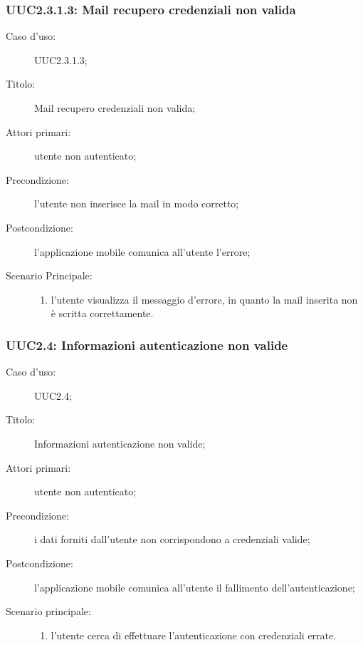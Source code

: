 \documentclass[../../../analisi-dei-requisiti.tex]{subfiles}
\begin{document}
\subsubsection{UUC2.3.1.3: Mail recupero credenziali non valida}%
\label{subs:UUC2.3.1.3}

\begin{description}
  \item[Caso d’uso:] UUC2.3.1.3;
  \item[Titolo:] Mail recupero credenziali non valida;
  \item[Attori primari:] utente non autenticato;
  \item[Precondizione:] l'utente non inserisce la mail in modo corretto;
  \item[Postcondizione:] l'applicazione mobile comunica all'utente l'errore;
  \item[Scenario Principale:]
        \begin{enumerate}
          \item l'utente visualizza il messaggio d'errore, in quanto la mail inserita non è scritta correttamente.
        \end{enumerate}
\end{description}

\subsubsection{UUC2.4: Informazioni autenticazione non valide}%
\label{subs:UUC2.4}
\begin{description}
  \item[Caso d’uso:] UUC2.4;
  \item[Titolo:] Informazioni autenticazione non valide;
  \item[Attori primari:] utente non autenticato;
  \item[Precondizione:] i dati forniti dall'utente non corrispondono a credenziali valide;
  \item[Postcondizione:] l'applicazione mobile comunica all'utente il fallimento dell'autenticazione;
  \item[Scenario principale:]
        \begin{enumerate}
          \item l'utente cerca di effettuare l'autenticazione con credenziali errate.
        \end{enumerate}
\end{description}
\end{document}
